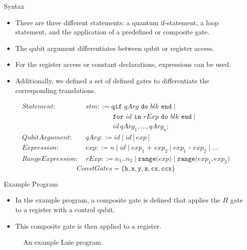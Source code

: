 \begin{frame}{Syntax}
    \begin{itemize}
        \item There are three different statements: a quantum if-statement, a loop statement, and the application of a predefined or composite gate.
        \item The qubit argument differentiates between qubit or register access.
        \item For the register access or constant declarations, expressions can be used.
        \item Additionally, we defined a set of defined gates to differentiate the corresponding translations.
    \end{itemize}
    \begin{align*}
        Statement: \ & stm ::= \texttt{qif } qArg \texttt{ do }  blk \texttt{ end} \mid\\
                     & \quad \quad \quad \quad \texttt{for } id \texttt{ in } rExp \texttt{ do } blk \texttt{ end} \mid \\
                     & \quad \quad \quad \quad id \ qArg_1, \dots, qArg_n \texttt{;}\\
        QubitArgument: \ & qArg ::= id \mid id[exp]\\
        Expression: \ & exp ::= n \mid id \mid exp_1 \texttt{ + } exp_2 \mid exp_1 \texttt{ - } exp_2 \mid \dots\\
        RangeExpression: \ & rExp ::= n_1 .. n_2 \mid \texttt{range(} exp \texttt{)} \mid \texttt{range(} exp_1, exp_2 \texttt{)}
    \end{align*}
    \vspace{\alignmargin}
    \begin{equation*}
        ConstGates = \{\texttt{h}, \texttt{x}, \texttt{y}, \texttt{z}, \texttt{cx}, \texttt{ccx}\}
    \end{equation*}
\end{frame}

\begin{frame}{Example Program}
    \begin{itemize}
        \item In the example program, a composite gate is defined that applies the $H$ gate to a register with a control qubit.
        \item This composite gate is then applied to a register.
    \end{itemize}
    \begin{figure}[htp]
        \centering     
        
        \caption{An example Luie program.}
        \label{fig:qft_example}
    \end{figure}
\end{frame}


